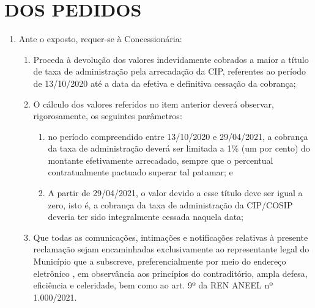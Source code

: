 \section{DOS PEDIDOS}

\begin{enumerate}[resume]
\item Ante o exposto, requer-se à Concessionária:
    \begin{enumerate}
        \item Proceda à devolução dos valores indevidamente cobrados a maior a título de taxa de administração pela arrecadação da CIP, referentes ao período de 13/10/2020 até a data da efetiva e definitiva cessação da cobrança;

        \item O cálculo dos valores referidos no item anterior deverá observar, rigorosamente, os seguintes parâmetros:
        
        \begin{enumerate}
            \item no período compreendido entre 13/10/2020 e 29/04/2021, a cobrança da taxa de administração deverá ser limitada a 1\% (um por cento) do montante efetivamente arrecadado, sempre que o percentual contratualmente pactuado superar tal patamar; e 
            \item A partir de 29/04/2021, o valor devido a esse título deve ser igual a zero, isto é, a cobrança da taxa de administração da CIP/COSIP deveria ter sido integralmente cessada naquela data;
        \end{enumerate}

        \item Que todas as comunicações, intimações e notificações relativas à presente reclamação sejam encaminhadas exclusivamente ao representante legal do Município que a subscreve, preferencialmente por meio do endereço eletrônico \emailEmpresa{}, em observância aos princípios do contraditório, ampla defesa, eficiência e celeridade, bem como ao art. 9º da REN ANEEL nº 1.000/2021.

    \end{enumerate}
\end{enumerate}